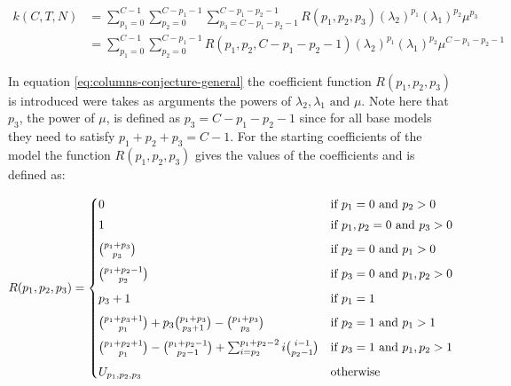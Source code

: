 \begin{align}\label{eq:columns-conjecture-general}
    k(C,T,N) &= \sum_{p_1=0}^{C-1} \sum_{p_2=0}^{C-p_1-1} 
    \sum_{p_3=C - p_1 - p_2 - 1}^{C - p_1 - p_2 - 1} R(p_1, p_2, p_3) 
    (\lambda_2)^{p_1} (\lambda_1)^{p_2} \mu^{p_3} \nonumber \\ 
    &= \sum_{p_1=0}^{C-1} \sum_{p_2=0}^{C-p_1-1} R(p_1, p_2, C-p_1-p_2-1) 
    (\lambda_2)^{p_1} (\lambda_1)^{p_2} \mu^{C-p_1-p_2-1} 
\end{align}

In equation \ref{eq:columns-conjecture-general} the coefficient function 
\(R(p_1,p_2,p_3)\) is introduced were takes as arguments the powers of 
\(\lambda_2, \lambda_1 \text{ and } \mu\). 
Note here that \(p_3\), the power of \(\mu\), is defined as \(p_3=C-p_1-p_2-1\) 
since for all base models they need to satisfy \(p_1 + p_2 + p_3 = C-1\). 
For the starting coefficients of the model the function \(R(p_1,p_2,p_3)\) gives 
the values of the coefficients and is defined as:

\begin{equation} \label{eq:coefficient-function}
    R(p_1,p_2,p_3) = 
    \begin{cases}
        0 & \text{if } p_1 = 0 \text{ and } p_2 > 0 \vspace{0.1cm} \\
        1 & \text{if } p_1, p_2 = 0 \text{ and } p_3 > 0 \vspace{0.2cm} \\
        \binom{p_1 + p_3}{p_3} & \text{if } p_2 = 0 
        \text{ and } p_1 > 0 \vspace{0.2cm} \\
        \binom{p_1 + p_2 - 1}{p_2} & \text{if } p_3 = 0 
        \text{ and } p_1, p_2 > 0 \vspace{0.2cm} \\
        p_3 + 1 & \text{if } p_1 = 1 \vspace{0.2cm} \\
        \binom{p_1 + p_3 + 1}{p_1} + p_3 \binom{p_1 + p_3}{p_3+1} - 
        \binom{p_1 + p_3}{p_3} & \text{if } p_2 = 1 
        \text{ and } p_1 > 1 \vspace{0.2cm} \\
        \binom{p_1 + p_2 + 1}{p_1} - \binom{p_1 + p_2 - 1}{p_2-1} + 
        \sum_{i=p_2}^{p_1 + p_2 - 2} i \binom{i-1}{p_2 - 1} & \text{if } p_3 = 1 
        \text{ and } p_1,p_2 > 1 \vspace{0.2cm} \\
        U_{p_1,p_2,p_3} & \text{otherwise}
    \end{cases}
\end{equation}

